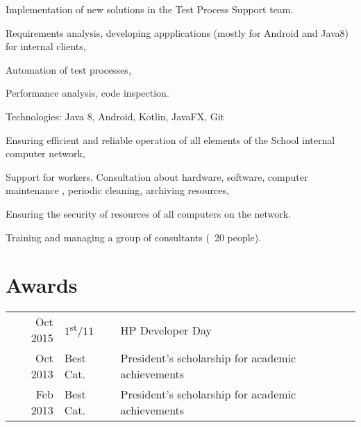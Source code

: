 \documentclass[]{deedy-resume-openfont}
\begin{document}
\begin{minipage}[t]{0.66\textwidth}
Implementation of new solutions in the Test Process Support team.
\begin{tightemize}
\item Requirements analysis, developing appplications (mostly for Android and Java8) for internal clients,
\item Automation of test processes,
\item Performance analysis, code inspection.
\end{tightemize}
Technologies: Java 8, Android, Kotlin, JavaFX, Git
\sectionsep

\begin{tightemize}
\item Ensuring efficient and reliable operation of all elements of the School internal computer network,
\item Support for workers. Consultation about hardware, software, computer maintenance , periodic cleaning, archiving resources, 
\item Ensuring the security of resources of all computers on the network.
\end{tightemize}
\sectionsep

\begin{tightemize}
\item Training and managing a group of consultants (~20 people).\end{tightemize}
\sectionsep


 \section{Awards} 
 \begin{tabular}{rll}
 Oct 2015	     & 1\textsuperscript{st}/11  & HP Developer Day\\
 Oct 2013	     & Best Cat.  & President’s scholarship for academic achievements \\
 Feb 2013	     & Best Cat.  & President’s scholarship for academic achievements \\
 \end{tabular}
 \sectionsep

\end{minipage} 
\end{document}

